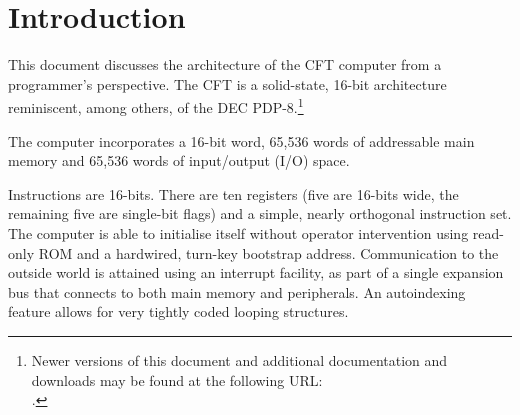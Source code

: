 







\section{Introduction}

  This document discusses the architecture of the CFT computer from a
  programmer's perspective. The CFT is a solid-state, 16-bit
  architecture reminiscent, among others, of the DEC
  PDP-8.\footnote{Newer versions of this document and additional
    documentation and downloads may be found at the following URL:\\
    .}

  The computer incorporates a 16-bit word, 65,536 words of addressable
  main memory and 65,536 words of input/output (I/O) space.

  Instructions are 16-bits. There are ten \glspl{register} (five are 16-bits
  wide, the remaining five are single-bit flags) and a simple, nearly
  orthogonal instruction set. The computer is able to initialise itself without
  operator intervention using read-only ROM and a hardwired, turn-key bootstrap
  address. Communication to the outside world is attained using an interrupt
  facility, as part of a single expansion bus that connects to both main memory
  and peripherals. An autoindexing feature allows for very tightly coded
  looping structures.

